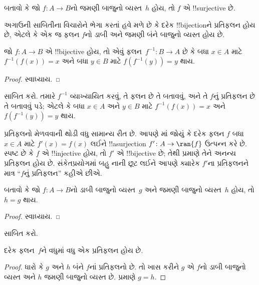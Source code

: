 \documentclass[../../../include/open-logic-section]{subfiles}
\begin{document}
\begin{prob}
બતાવો કે જો $f\colon A \to B$નો જમણી બાજુનો
વ્યસ્ત~$h$ હોય, તો $f$ એ !!{surjective} છે.
\end{prob}

\begin{explain}
અગાઉની સાબિતીના વિચારોને ભેગા કરતાં હવે મળે છે કે
દરેક !!{bijection}ને પ્રતિફલન હોય છે, એટલે કે
એક જ ફલન $f$નો ડાબી અને જમણી બંને બાજુનો વ્યસ્ત હોય છે.
\end{explain}

\begin{prop}
જો $f\colon A \to B$ એ !!{bijective} હોય, તો એવું
ફલન~$f^{-1}\colon B \to A$ છે કે બધા $x \in A$
માટે $f^{-1}(f(x)) = x$ અને બધા $y \in B$
માટે $f(f^{-1}(y)) = y$ થાય.
\end{prop}

\begin{proof}
સ્વાધ્યાય.
\end{proof}

\begin{prob}
 સાબિત કરો.
તમારે $f^{-1}$ વ્યાખ્યાયિત કરવું, તે ફલન છે તે
બતાવવું, અને તે $f$નું પ્રતિફલન છે તે બતાવવું પડે;
એટલે કે બધા $x \in A$ અને $y \in B$ માટે
$f^{-1}(f(x)) = x$ અને $f(f^{-1}(y)) = y$ થાય.
\end{prob}

\begin{explain}
પ્રતિફલનો મેળવવાની થોડી વધુ સામાન્ય રીત છે.
આપણે માં જોયું કે દરેક ફલન $f$
બધા $x \in A$ માટે $f'(x) = f(x)$ લઈને
!!a{surjection} $f'
\colon A \to \ran{f}$ ઉત્પન્ન કરે છે.
સ્પષ્ટ છે કે $f$ એ !!{injective} હોય, તો
$f'$ એ !!{bijective} છે; તેથી
 પ્રમાણે તેને અનન્ય
પ્રતિફલન હોય છે. સંકેતપ્રયોગમાં બહુ નાની છૂટ લઈને
આપણે ક્યારેક $f'$ના પ્રતિફલનને માત્ર
“$f$નું પ્રતિફલન” કહીએ છીએ.
\end{explain}

\begin{prop}%
બતાવો કે જો $f\colon A \to B$નો ડાબી બાજુનો
વ્યસ્ત~$g$ અને જમણી બાજુનો વ્યસ્ત~$h$ હોય,
તો $h = g$ થાય.
\end{prop}

\begin{proof}
સ્વાધ્યાય.
\end{proof}

\begin{prob}
 સાબિત કરો.
\end{prob}

\begin{prop}
દરેક ફલન~$f$ને વધુમાં વધુ એક પ્રતિફલન હોય છે.
\end{prop}

\begin{proof}
ધારો કે $g$ અને $h$ બંને $f$નાં પ્રતિફલનો છે.
તો ખાસ કરીને $g$ એ $f$નો ડાબી બાજુનો વ્યસ્ત
અને $h$ જમણી બાજુનો વ્યસ્ત છે.
 પ્રમાણે $g = h$.
\end{proof}
\end{document}
